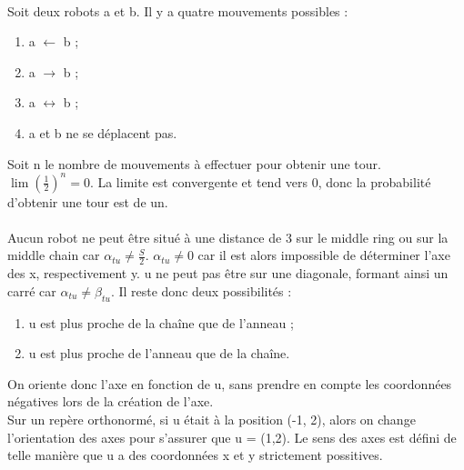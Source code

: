 \documentclass[a4paper,10pt]{article}
\begin{document}
\paragraph{}
Soit deux robots a et b. Il y a quatre mouvements possibles :
\begin{enumerate}
 \item a $\leftarrow$ b ;
 \item a $\rightarrow$ b ;
 \item a $\leftrightarrow$ b ;
 \item a et b ne se déplacent pas.
\end{enumerate}

Soit n le nombre de mouvements à effectuer pour obtenir une tour. $\lim (\frac{1}{2})^n = 0$. 
La limite est convergente et tend vers 0, donc la probabilité d'obtenir une tour est de un.

\paragraph{}
\paragraph{}

Aucun robot ne peut être situé à une distance de 3 sur le middle ring ou sur la middle chain car $\alpha_{tu} \ne \frac{S}{2}$.
$\alpha_{tu} \ne 0$ car il est alors impossible de déterminer l'axe des x, respectivement y.
u ne peut pas être sur une diagonale, formant ainsi un carré car $\alpha_{tu} \ne \beta_{tu}$.
Il reste donc deux possibilités :
\begin{enumerate}
 \item u est plus proche de la chaîne que de l'anneau ;
 \item u est plus proche de l'anneau que de la chaîne.
\end{enumerate}

On oriente donc l'axe en fonction de u, sans prendre en compte les coordonnées négatives lors de la création de l'axe. 
\\Sur un repère orthonormé, si u était à la position (-1, 2), alors on change l'orientation des axes pour s'assurer que u = (1,2). Le sens des axes est défini de telle manière que u a des coordonnées x et y strictement possitives.
\end{document}
